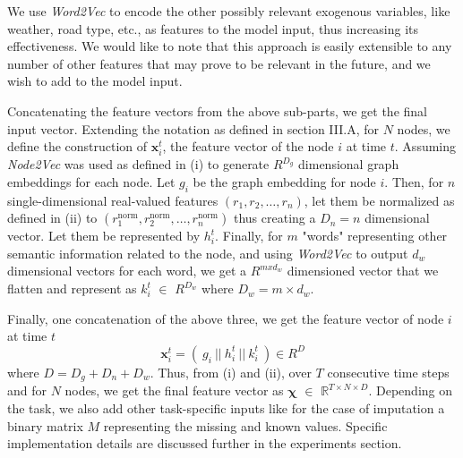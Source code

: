 We use \textit{Word2Vec} to encode the other possibly relevant exogenous variables, like weather, road type, etc., as features to the model input, thus increasing its effectiveness. We would like to note that this approach is easily extensible to any number of other features that may prove to be relevant in the future, and we wish to add to the model input.

\vspace{3ex} Concatenating the feature vectors from the above sub-parts, we get the final input vector. Extending the notation as defined in section III.A, for \(N\) nodes, we define the construction of \(\mathbf{x}_i^t\), the feature vector of the node \(i\) at time \(t\). Assuming \textit{Node2Vec} was used as defined in (i) to generate \(R^{D_g}\) dimensional graph embeddings for each node. Let \(g_i\) be the graph embedding for node \(i\). Then, for \(n\) single-dimensional real-valued features \((r_1, r_2, \ldots, r_n)\), let them be normalized as defined in (ii) to \((r_1^{\text{norm}}, r_2^{\text{norm}}, \ldots, r_n^{\text{norm}})\) thus creating a \(D_n = n\) dimensional vector. Let them be represented by \(h_i^t\). Finally, for \(m\) "words" representing other semantic information related to the node, and using \textit{Word2Vec} to output \(d_w\) dimensional vectors for each word, we get a \(R^{mxd_w}\) dimensioned vector that we flatten and represent as \(k_i^t\) \(\in\) \(R^{D_w}\) where \(D_w = m \times d_w\).

Finally, one concatenation of the above three, we get the feature vector of node \(i\) at time \(t\) 
\[\mathbf{x}_i^t = (\ g_i\ ||\ h_i^t\ ||\ k_i^t\ ) \in R^D\] 
where \(D = D_g+D_n+D_w\).
Thus, from (i) and (ii), over \( T \) consecutive time steps and for \( N \) nodes, we get the final feature vector as \( \mathbf{\chi} \)  \(\in\) \( \mathbb{R}^{T \times N \times D} \).
Depending on the task, we also add other task-specific inputs like for the case of imputation a binary matrix \( M \) representing the missing and known values. Specific implementation details are discussed further in the experiments section.